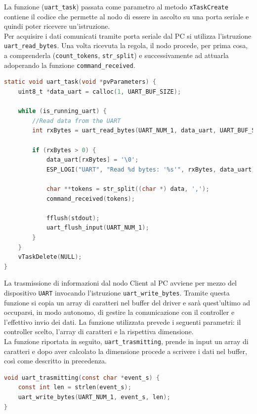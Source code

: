 \noindent La funzione (\texttt{uart\_task}) passata come parametro al metodo \texttt{xTaskCreate} contiene il codice che permette al nodo di essere in ascolto su una porta seriale e quindi poter ricevere un'istruzione. \\
Per acquisire i dati comunicati tramite porta seriale dal PC si utilizza l'istruzione \texttt{uart\_read\_bytes}. Una volta ricevuta la regola, il nodo procede, per prima cosa, a comprenderla (\texttt{count\_tokens}, \texttt{str\_split}) e successivamente ad attuarla adoperando la funzione \texttt{command\_received}.

\begin{lstlisting}[language=C, caption= acquisizione dati attraverso il \texttt{UART}]
static void uart_task(void *pvParameters) {
    uint8_t *data_uart = calloc(1, UART_BUF_SIZE);

    while (is_running_uart) {
        //Read data from the UART
        int rxBytes = uart_read_bytes(UART_NUM_1, data_uart, UART_BUF_SIZE, 100 / portTICK_RATE_MS);

        if (rxBytes > 0) {
            data_uart[rxBytes] = '\0';
            ESP_LOGI("UART", "Read %d bytes: '%s'", rxBytes, data_uart);

            char **tokens = str_split((char *) data, ',');
            command_received(tokens);

            fflush(stdout);
            uart_flush_input(UART_NUM_1);
        }
    }
    vTaskDelete(NULL);
}
\end{lstlisting}

\noindent La trasmissione di informazioni dal nodo Client al PC avviene per mezzo del dispositivo \texttt{UART} invocando l'istruzione \texttt{uart\_write\_bytes}. Tramite questa funzione si copia un array di caratteri nel buffer del driver e sarà quest'ultimo ad occuparsi, in modo autonomo, di gestire la comunicazione con il controller e l'effettivo invio dei dati. La funzione utilizzata prevede i seguenti parametri: il controller scelto, l'array di caratteri e la rispettiva dimensione. \\
La funzione riportata in seguito, \texttt{uart\_trasmitting}, prende in input un array di caratteri e dopo aver calcolato la dimensione procede a scrivere i dati nel buffer, così come descritto in precedenza.

\begin{lstlisting}[language=C, caption= operazione di trasmissione dati tramite lo strumento \texttt{UART}]
void uart_trasmitting(const char *event_s) {
    const int len = strlen(event_s);
    uart_write_bytes(UART_NUM_1, event_s, len);
}
\end{lstlisting}


